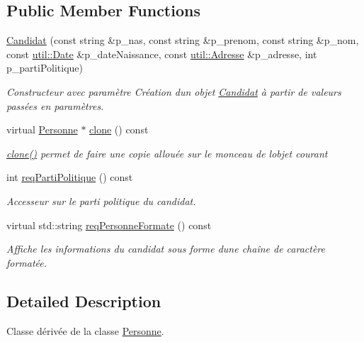 \subsection*{Public Member Functions}
\begin{DoxyCompactItemize}
\item 
\hyperlink{classelections_1_1Candidat_a543dcf32971b2fc7c8fe984ea007c83a}{Candidat} (const string \&p\+\_\+nas, const string \&p\+\_\+prenom, const string \&p\+\_\+nom, const \hyperlink{classutil_1_1Date}{util\+::\+Date} \&p\+\_\+date\+Naissance, const \hyperlink{classutil_1_1Adresse}{util\+::\+Adresse} \&p\+\_\+adresse, int p\+\_\+parti\+Politique)
\begin{DoxyCompactList}\small\item\em Constructeur avec paramètre Création d\textquotesingle{}un objet \hyperlink{classelections_1_1Candidat}{Candidat} à partir de valeurs passées en paramètres. \end{DoxyCompactList}\item 
virtual \hyperlink{classelections_1_1Personne}{Personne} $\ast$ \hyperlink{classelections_1_1Candidat_ac93fed3409eb4617620d70a1d031ae89}{clone} () const
\begin{DoxyCompactList}\small\item\em \hyperlink{classelections_1_1Candidat_ac93fed3409eb4617620d70a1d031ae89}{clone()} permet de faire une copie allouée sur le monceau de l\textquotesingle{}objet courant \end{DoxyCompactList}\item 
int \hyperlink{classelections_1_1Candidat_a150b2e680fbea708f222e5e8bfd823e4}{req\+Parti\+Politique} () const
\begin{DoxyCompactList}\small\item\em Accesseur sur le parti politique du candidat. \end{DoxyCompactList}\item 
virtual std\+::string \hyperlink{classelections_1_1Candidat_a4b614df7326d8aacdec158b77a6ec406}{req\+Personne\+Formate} () const
\begin{DoxyCompactList}\small\item\em Affiche les informations du candidat sous forme d\textquotesingle{}une chaîne de caractère formatée. \end{DoxyCompactList}\end{DoxyCompactItemize}


\subsection{Detailed Description}
Classe dérivée de la classe \hyperlink{classelections_1_1Personne}{Personne}. 

